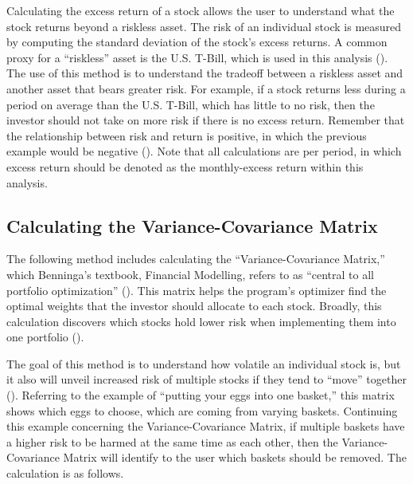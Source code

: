 \documentclass[12pt,english]{article}
\begin{document}
\begin{doublespace}
            \indent{}\indent{}
            Calculating the excess return of a stock allows the user to understand what the stock returns beyond a riskless asset. The risk of an individual stock is measured by computing the standard deviation of the stock's excess returns. A common proxy for a “riskless” asset is the U.S. T-Bill, which is used in this analysis (\citet{Simon2008}). The use of this method is to understand the tradeoff between a riskless asset and another asset that bears greater risk. For example, if a stock returns less during a period on average than the U.S. T-Bill, which has little to no risk, then the investor should not take on more risk if there is no excess return. Remember that the relationship between risk and return is positive, in which the previous example would be negative (\citet{Simon2008}). Note that all calculations are per period, in which excess return should be denoted as the monthly-excess return within this analysis. 
        
        \subsection{Calculating the Variance-Covariance Matrix}
        
            \indent{}\indent{}
        	The following method includes calculating the “Variance-Covariance Matrix,” which Benninga’s textbook, Financial Modelling, refers to as “central to all portfolio optimization” (\citet{Simon2008}). This matrix helps the program’s optimizer find the optimal weights that the investor should allocate to each stock. Broadly, this calculation discovers which stocks hold lower risk when implementing them into one portfolio (\citet{Simon2008}). 
            
            \indent{}\indent{}
        	The goal of this method is to understand how volatile an individual stock is, but it also will unveil increased risk of multiple stocks if they tend to “move” together (\citet{Simon2008}). Referring to the example of “putting your eggs into one basket,” this matrix shows which eggs to choose, which are coming from varying baskets. Continuing this example concerning the Variance-Covariance Matrix, if multiple baskets have a higher risk to be harmed at the same time as each other, then the Variance-Covariance Matrix will identify to the user which baskets should be removed. The calculation is as follows.
            

\end{doublespace}
\end{document}
